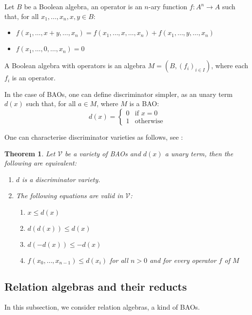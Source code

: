 \documentclass[a4paper]{article}
\theoremstyle{defin}
\theoremstyle{theorem}
\newtheorem{theorem}{Theorem}
\theoremstyle{claim}
\theoremstyle{prop}
\theoremstyle{lemma}
\theoremstyle{fact}
\theoremstyle{ex}
\theoremstyle{col}
\begin{document}
Let $B$ be a Boolean algebra, an operator is an $n$-ary function $f : A^n \to A$ such that, for all $x_1, \dots, x_n, x, y \in B$:

\begin{itemize}
\item $f(x_1, \dots, x + y, \dots, x_n) = f(x_1, \dots, x, \dots, x_n) + f(x_1, \dots, y, \dots, x_n)$
\item $f(x_1, \dots, 0, \dots, x_n) = 0$
\end{itemize}

A Boolean algebra with operators is an algebra $M = (B, (f_i)_{i \in I})$, where each $f_i$ is an operator.

In the case of BAOs, one can define discriminator simpler, as an unary term $d(x)$ such that, for all $a \in M$, where $M$ is a BAO:
\begin{equation}
d(x) =
\begin{cases}
  0 & \text{if $x = 0$} \\
  1 & \text{otherwise}
\end{cases}
\end{equation}

One can characterise discriminator varieties as follows, see \cite[Lemma 2.1]{andreka1998notions}:
\begin{theorem} Let $\mathcal{V}$ be a variety of BAOs and $d(x)$ a unary term, then the following are equivalent:

\begin{enumerate}
\item $d$ is a discriminator variety.
\item The following equations are valid in $\mathcal{V}$:
\begin{enumerate}
\item $x \leq d(x)$
\item $d(d(x)) \leq d(x)$
\item $d(- d(x)) \leq - d(x)$
\item $f(x_0, \dots, x_{n-1}) \leq d(x_i)$ for all $n > 0$ and for every operator $f$ of $M$
\end{enumerate}
\end{enumerate}
\end{theorem}

\subsection{Relation algebras and their reducts}

In this subsection, we consider relation algebras, a kind of BAOs.
\end{document}
